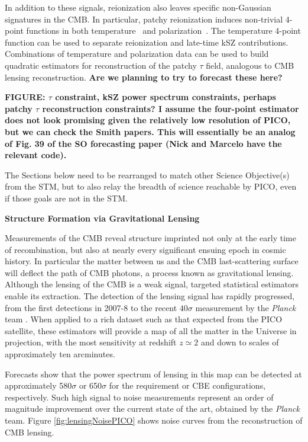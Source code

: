\documentclass[PICOReport.tex]{subfiles}
\begin{document}
In addition to these signals, reionization also leaves specific non-Gaussian signatures in the CMB.  In particular, patchy reionization induces non-trivial 4-point functions in both temperature~\citep{SmithFerraro2017} and polarization~\citep{DvorkinSmith2008}.  The temperature 4-point function can be used to separate reionization and late-time kSZ contributions.  Combinations of temperature and polarization data can be used to build quadratic estimators for reconstruction of the patchy $\tau$ field, analogous to CMB lensing reconstruction.  \textbf{Are we planning to try to forecast these here?}

\textbf{FIGURE: $\tau$ constraint, kSZ power spectrum constraints, perhaps patchy $\tau$ reconstruction constraints? I assume the four-point estimator does not look promising given the relatively low resolution of PICO, but we can check the Smith papers.  This will essentially be an analog of Fig. 39 of the SO forecasting paper (Nick and Marcelo have the relevant code).}


The Sections below need to be rearranged to match other Science Objective(s) from the STM, but to also relay the 
breadth of science reachable by PICO, even if those goals are not in the STM. 

{\bf Structure Formation via Gravitational Lensing}


Measurements of the CMB reveal structure imprinted not only at the early time of recombination, but also at nearly every significant ensuing epoch in cosmic history.  In particular the matter between us and the CMB last-scattering surface will deflect the path of CMB photons, a process known as gravitational lensing.  Although the lensing of the CMB is a weak signal, targeted statistical estimators enable its  extraction.  
The detection of the lensing signal has rapidly progressed, from the first detections in 2007-8 \citep{2007PhRvD..76d3510S, 2008PhRvD..78d3520H} to the recent $ 40\sigma$ measurement by the {\it Planck} team \cite{2018arXiv180706210P}.  When applied to a rich dataset such as that expected from the PICO satellite, these estimators will provide a map of all the matter in the Universe in projection, with the most sensitivity at redshift $z \simeq 2$ and down to scales of approximately ten arcminutes.  

Forecasts show that the power spectrum of lensing in this map can be detected at approximately 580$\sigma$ or 650$\sigma$ for the requirement or CBE configurations, respectively.  Such high signal to noise measurements represent an order of magnitude improvement over the current state of the art, obtained by the  {\it Planck} team.  Figure \ref{fig:lensingNoisePICO} shows noise curves from the reconstruction of CMB lensing.  
\end{document}

